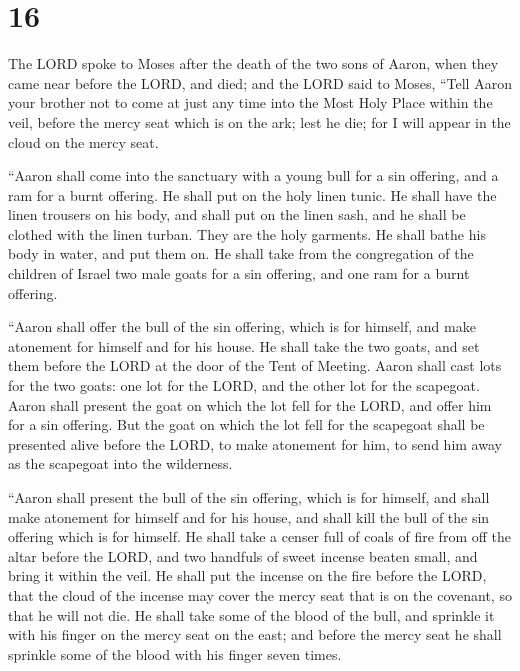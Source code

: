 \hypertarget{section-15}{%
\section{16}\label{section-15}}

 The LORD spoke to Moses after the death of the two sons of
Aaron, when they came near before the LORD, and died;  and
the LORD said to Moses, ``Tell Aaron your brother not to come at just
any time into the Most Holy Place within the veil, before the mercy seat
which is on the ark; lest he die; for I will appear in the cloud on the
mercy seat.

 ``Aaron shall come into the sanctuary with a young bull for
a sin offering, and a ram for a burnt offering.  He shall
put on the holy linen tunic. He shall have the linen trousers on his
body, and shall put on the linen sash, and he shall be clothed with the
linen turban. They are the holy garments. He shall bathe his body in
water, and put them on.  He shall take from the congregation
of the children of Israel two male goats for a sin offering, and one ram
for a burnt offering.

 ``Aaron shall offer the bull of the sin offering, which is
for himself, and make atonement for himself and for his house.
 He shall take the two goats, and set them before the LORD
at the door of the Tent of Meeting.  Aaron shall cast lots
for the two goats: one lot for the LORD, and the other lot for the
scapegoat.  Aaron shall present the goat on which the lot
fell for the LORD, and offer him for a sin offering.  But
the goat on which the lot fell for the scapegoat shall be presented
alive before the LORD, to make atonement for him, to send him away as
the scapegoat into the wilderness.

 ``Aaron shall present the bull of the sin offering, which
is for himself, and shall make atonement for himself and for his house,
and shall kill the bull of the sin offering which is for himself.
 He shall take a censer full of coals of fire from off the
altar before the LORD, and two handfuls of sweet incense beaten small,
and bring it within the veil.  He shall put the incense on
the fire before the LORD, that the cloud of the incense may cover the
mercy seat that is on the covenant, so that he will not die.
 He shall take some of the blood of the bull, and sprinkle
it with his finger on the mercy seat on the east; and before the mercy
seat he shall sprinkle some of the blood with his finger seven times.

